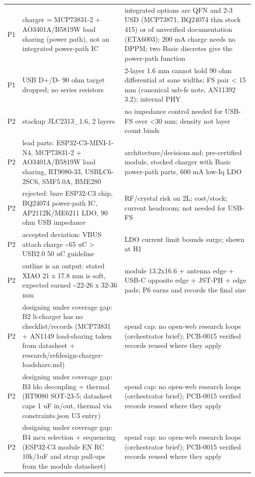 \documentclass[11pt]{article}
\begin{document}
{\begin{longtable}{lp{5.2cm}p{7.2cm}}
P1 & charger = MCP73831-2 + AO3401A/B5819W load sharing (power path), not an integrated power-path IC & integrated options are QFN and 2-3 USD (MCP73871, BQ24074 thin stock 415) or of unverified documentation (ETA6003); 200 mA charge needs no DPPM; two Basic discretes give the power-path function \\
P1 & USB D+/D- 90 ohm target dropped; no series resistors & 2-layer 1.6 mm cannot hold 90 ohm differential at sane widths; FS pair \textless{} 15 mm (canonical usb-fs note, AN11392 3.2); internal PHY \\
P2 & stackup JLC2313\_1.6, 2 layers & no impedance control needed for USB-FS over \textless{}30 mm; density not layer count binds \\
P2 & lead parts: ESP32-C3-MINI-1-N4, MCP73831-2 + AO3401A/B5819W load sharing, RT9080-33, USBLC6-2SC6, SMF5.0A, BME280 & architecture/decisions.md; pre-certified module, stocked charger with Basic power-path parts, 600 mA low-Iq LDO \\
P2 & rejected: bare ESP32-C3 chip, BQ24074 power-path IC, AP2112K/ME6211 LDO, 90 ohm USB impedance & RF/crystal risk on 2L; cost/stock; current headroom; not needed for USB-FS \\
P2 & accepted deviation: VBUS attach charge \textasciitilde{}65 uC \textgreater{} USB2.0 50 uC guideline & LDO current limit bounds surge; shown at H1 \\
P2 & outline is an output: stated XIAO 21 x 17.8 mm is soft, expected earned \textasciitilde{}22-26 x 32-36 mm & module 13.2x16.6 + antenna edge + USB-C opposite edge + JST-PH + edge pads; P6 earns and records the final size \\
P2 & designing under coverage gap: B2 li-charger has no checklist/records (MCP73831 + AN1149 load-sharing taken from datasheet + research/refdesign-charger-loadshare.md) & spend cap: no open-web research loops (orchestrator brief); PCB-0015 verified records reused where they apply \\
P2 & designing under coverage gap: B3 ldo decoupling + thermal (RT9080 SOT-23-5; datasheet caps 1 uF in/out, thermal via constraints.json U3 entry) & spend cap: no open-web research loops (orchestrator brief); PCB-0015 verified records reused where they apply \\
P2 & designing under coverage gap: B4 mcu selection + sequencing (ESP32-C3 module EN RC 10k/1uF and strap pull-ups from the module datasheet) & spend cap: no open-web research loops (orchestrator brief); PCB-0015 verified records reused where they apply \\

\end{longtable}}
\end{document}
